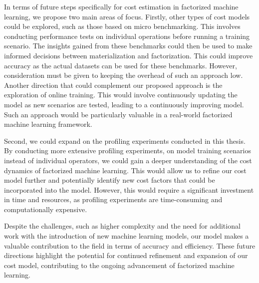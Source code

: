 In terms of future steps specifically for cost estimation in factorized machine learning, we propose two main areas of focus. Firstly, other types of cost models could be explored, such as those based on micro benchmarking. This involves conducting performance tests on individual operations before running a training scenario. The insights gained from these benchmarks could then be used to make informed decisions between materialization and factorization. This could improve accuracy as the actual datasets can be used for these benchmarks. However, consideration must be given to keeping the overhead of such an approach low. Another direction that could complement our proposed approach is the exploration of online training. This would involve continuously updating the model as new scenarios are tested, leading to a continuously improving model. Such an approach would be particularly valuable in a real-world factorized machine learning framework.

Second, we could expand on the profiling experiments conducted in this thesis. By conducting more extensive profiling experiments, on model training scenarios instead of individual operators, we could gain a deeper understanding of the cost dynamics of factorized machine learning. This would allow us to refine our cost model further and potentially identify new cost factors that could be incorporated into the model. However, this would require a significant investment in time and resources, as profiling experiments are time-consuming and computationally expensive.

Despite the challenges, such as higher complexity and the need for additional work with the introduction of new machine learning models, our model makes a valuable contribution to the field in terms of accuracy and efficiency. These future directions highlight the potential for continued refinement and expansion of our cost model, contributing to the ongoing advancement of factorized machine learning.